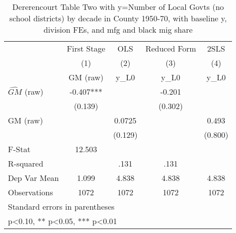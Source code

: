 \begin{table}[htbp]\centering
\def\sym#1{\ifmmode^{#1}\else\(^{#1}\)\fi}
\caption{Dererencourt Table Two with y=Number of Local Govts (no school districts) by decade in County 1950-70, with baseline y, division FEs, and mfg and black mig share}
\begin{tabular}{l*{4}{c}}
\toprule
                    & First Stage   &         OLS   &Reduced Form   &        2SLS   \\
                    &\multicolumn{1}{c}{(1)}&\multicolumn{1}{c}{(2)}&\multicolumn{1}{c}{(3)}&\multicolumn{1}{c}{(4)}\\
                    &\multicolumn{1}{c}{GM  (raw)}&\multicolumn{1}{c}{y\_L0}&\multicolumn{1}{c}{y\_L0}&\multicolumn{1}{c}{y\_L0}\\
\midrule
$\hat{GM}$ (raw)    &      -0.407***&               &      -0.201   &               \\
                    &     (0.139)   &               &     (0.302)   &               \\
\addlinespace
GM  (raw)           &               &      0.0725   &               &       0.493   \\
                    &               &     (0.129)   &               &     (0.800)   \\
\midrule
F-Stat              &      12.503   &               &               &               \\
R-squared           &               &        .131   &        .131   &               \\
Dep Var Mean        &       1.099   &       4.838   &       4.838   &       4.838   \\
Observations        &        1072   &        1072   &        1072   &        1072   \\
\bottomrule
\multicolumn{5}{l}{\footnotesize Standard errors in parentheses}\\
\multicolumn{5}{l}{\footnotesize * p<0.10, ** p<0.05, *** p<0.01}\\
\end{tabular}
\end{table}
